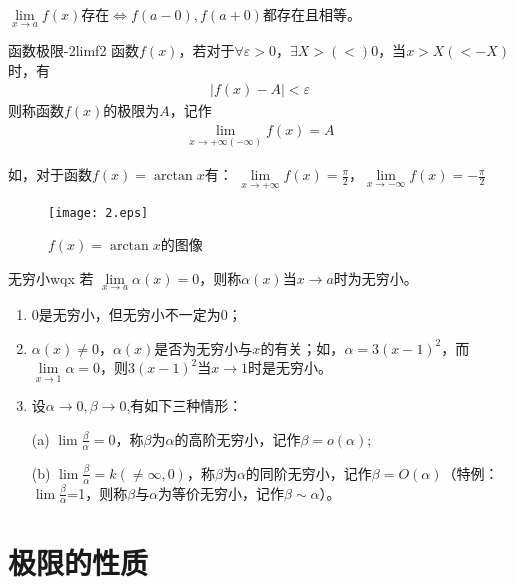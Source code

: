 \documentclass[cn,12pt,chinese]{elegantbook}
\begin{document}
\FiveStar $\lim\limits_{x \to a} f(x)$存在$\iff f(a-0),f(a+0)$都存在且相等。

\begin{definition}{函数极限-2}{limf2}
函数$f(x)$，若对于$ \forall\varepsilon>0 $，$ \exists X>(<)0 $，当$ x>X(<-X) $时，有
\begin{align}
    \vert{f(x)-A}\vert<\varepsilon
\end{align}
则称函数$f(x)$的极限为$A$，记作
\begin{align}
    \lim_{x\to +\infty(-\infty)} f(x)=A 
\end{align}
\end{definition}

如，对于函数$f(x)=\arctan{x}$有：
 $\lim\limits_{x\to +\infty} f(x)=\displaystyle\frac{\pi}{2}$，$\lim\limits_{x\to -\infty} f(x)=-\displaystyle \frac{\pi}{2}$

 \begin{figure}[htbp]
    \centering
    \texttt{[image: 2.eps]}
    \caption{$f(x)=\arctan{x}$的图像}
  \end{figure}
  
\begin{definition}{无穷小}{wqx}
若 $ \lim\limits_{x \to a} \alpha(x)=0$，则称$ \alpha(x)$当$x \to a$时为无穷小。
\end{definition}

\begin{note}
\begin{enumerate}
  \item 0是无穷小，但无穷小不一定为0；
  \item $\alpha(x)\neq 0$，$\alpha(x)$是否为无穷小与$ x $的有关；如，$\alpha=3(x-1)^2$，而$\lim\limits_{x \to 1}\alpha=0 $，则$3(x-1)^2$当$x \to 1$时是无穷小。
  \item 设$\alpha \to 0,\beta \to 0$,有如下三种情形：
  
  (a) $\lim \displaystyle\frac{\beta}{\alpha}=0$，称$ \beta $为$ \alpha $的高阶无穷小，记作$\beta=o(\alpha)$;
  
  (b) $\lim \displaystyle\frac{\beta}{\alpha}=k(\neq \infty,0)$，称$ \beta $为$ \alpha $的同阶无穷小，记作$\beta=O(\alpha)$（特例：$\lim \displaystyle\frac{\beta}{\alpha}$=1，则称$ \beta $与$ \alpha $为等价无穷小，记作$\beta \sim \alpha$）。
\end{enumerate}
\end{note}


\section{极限的性质}
\end{document}
